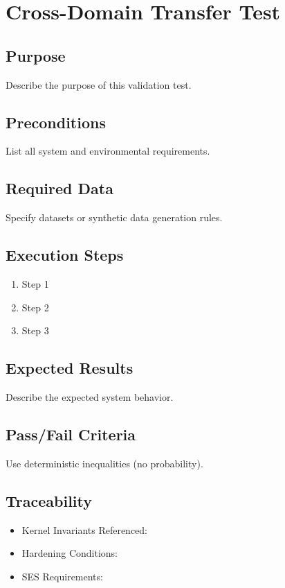 

\section*{Cross-Domain Transfer Test}

\subsection*{Purpose}
Describe the purpose of this validation test.

\subsection*{Preconditions}
List all system and environmental requirements.

\subsection*{Required Data}
Specify datasets or synthetic data generation rules.

\subsection*{Execution Steps}
\begin{enumerate}
    \item Step 1
    \item Step 2
    \item Step 3
\end{enumerate}

\subsection*{Expected Results}
Describe the expected system behavior.

\subsection*{Pass/Fail Criteria}
Use deterministic inequalities (no probability).

\subsection*{Traceability}
\begin{itemize}
    \item Kernel Invariants Referenced:
    \item Hardening Conditions:
    \item SES Requirements:
\end{itemize}
